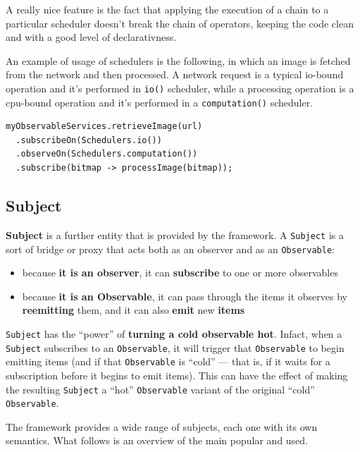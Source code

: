 A really nice feature is the fact that applying the execution of a chain
to a particular scheduler doesn't break the chain of operators, keeping
the code clean and with a good level of declarativness.

An example of usage of schedulers is the following, in which an image is
fetched from the network and then processed. A network request is a
typical io-bound operation and it's performed in \texttt{io()}
scheduler, while a processing operation is a cpu-bound operation and
it's performed in a \texttt{computation()} scheduler.

\begin{verbatim}
myObservableServices.retrieveImage(url)
  .subscribeOn(Schedulers.io())
  .observeOn(Schedulers.computation())
  .subscribe(bitmap -> processImage(bitmap));
\end{verbatim}


\subsection{Subject}\label{subject}

\textbf{Subject} is a further entity that is provided by the framework.
A \texttt{Subject} is a sort of bridge or proxy that acts both as an
observer and as an \texttt{Observable}:

\begin{itemize}
\itemsep1pt\parskip0pt
\item
  because \textbf{it is an observer}, it can \textbf{subscribe} to one
  or more observables
\item
  because \textbf{it is an Observable}, it can pass through the items it
  observes by \textbf{reemitting} them, and it can also \textbf{emit}
  new \textbf{items}
\end{itemize}

\texttt{Subject} has the ``power'' of \textbf{turning a cold observable
hot}. Infact, when a \texttt{Subject} subscribes to an
\texttt{Observable}, it will trigger that \texttt{Observable} to begin
emitting items (and if that \texttt{Observable} is ``cold'' --- that is,
if it waits for a subscription before it begins to emit items). This can
have the effect of making the resulting \texttt{Subject} a ``hot''
\texttt{Observable} variant of the original ``cold''
\texttt{Observable}.

The framework provides a wide range of subjects, each one with its own
semantics. What follows is an overview of the main popular and used.

